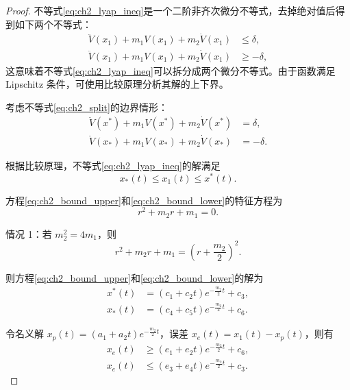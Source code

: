 \begin{proof}
不等式\eqref{eq:ch2_lyap_ineq}是一个二阶非齐次微分不等式，去掉绝对值后得到如下两个不等式：
\begin{subequations}\label{eq:ch2_split}
\begin{align}
\ddot{V}(x_1)+m_1V(x_1)+m_2\dot{V}(x_1) &\le \delta,\\
\ddot{V}(x_1)+m_1V(x_1)+m_2\dot{V}(x_1) &\ge -\delta,
\end{align}
\end{subequations}
这意味着不等式\eqref{eq:ch2_lyap_ineq}可以拆分成两个微分不等式。由于函数满足 Lipschitz 条件，可使用比较原理分析其解的上下界。

考虑不等式\eqref{eq:ch2_split}的边界情形：
\begin{subequations}
\begin{align}
\ddot{V}(x^*)+m_1V(x^*)+m_2\dot{V}(x^*) &= \delta, \label{eq:ch2_bound_upper}\\
\ddot{V}(x_*)+m_1V(x_*)+m_2\dot{V}(x_*) &= -\delta. \label{eq:ch2_bound_lower}
\end{align}
\end{subequations}

根据比较原理，不等式\eqref{eq:ch2_lyap_ineq}的解满足
\begin{equation}\label{eq:ch2_compare}
x_*(t)\le x_1(t)\le x^*(t).
\end{equation}

方程\eqref{eq:ch2_bound_upper}和\eqref{eq:ch2_bound_lower}的特征方程为
\begin{equation}\label{eq:ch2_bound_char}
r^2+m_2r+m_1=0.
\end{equation}

情况 1：若 $m_2^2=4m_1$，则
\begin{equation}\label{eq:ch2_bound_case1_char}
r^2+m_2r+m_1=\left(r+\frac{m_2}{2}\right)^2.
\end{equation}

则方程\eqref{eq:ch2_bound_upper}和\eqref{eq:ch2_bound_lower}的解为
\begin{subequations}\label{eq:ch2_bound_case1_sol}
\begin{align}
x^*(t)&=(c_1+c_2t)e^{-\frac{m_2}{2}t}+c_3,\\
x_*(t)&=(c_4+c_5t)e^{-\frac{m_2}{2}t}+c_6.
\end{align}
\end{subequations}

令名义解 $x_p(t)=(a_1+a_2t)e^{-\frac{m_2}{2}t}$，误差 $x_e(t)=x_1(t)-x_p(t)$，则有
\begin{subequations}\label{eq:ch2_bound_case1_err}
\begin{align}
x_e(t)&\ge (e_1+e_2t)e^{-\frac{m_2}{2}t}+c_6,\\
x_e(t)&\le (e_3+e_4t)e^{-\frac{m_2}{2}t}+c_3.
\end{align}
\end{subequations}


\end{proof}
